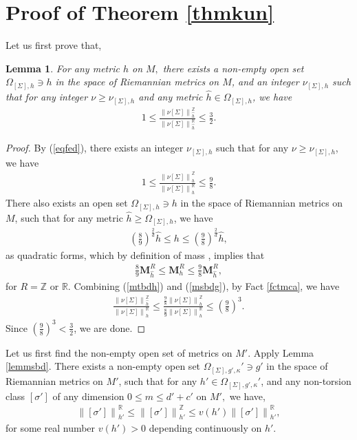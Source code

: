 \documentclass[11pt,a4paper]{amsart}
\numberwithin{equation}{section}
\newcommand{\Om}{\Omega}
\newcommand{\si}{\sigma}
\newcommand{\Si}{\Sigma}
\newcommand{\ms}{\mathbf{M}}
\newcommand{\no}[1]{\left\lVert#1\right\rVert}
\newcommand{\ka}{\kappa}
\newcommand{\R}{\mathbb{R}}
\newcommand{\Z}{\mathbb{Z}}
\theoremstyle{plain}
\newtheorem{lem}{Lemma}[subsection]
\theoremstyle{definition}
\numberwithin{equation}{subsection}
\begin{document}
		\section{Proof of Theorem \ref{thmkun}}\label{secpfp}	Let us first prove that,
	\begin{lem}\label{lemfaa}
		For any metric $h$ on $M,$ there exists a non-empty open set $\Om_{[\Si],h}\ni h$ in the space of Riemannian metrics on $M$, and an integer $\nu_{[\Si],h}$ such that for any integer $\nu\ge \nu_{[\Si],h}$ and any metric ${\hat{h}}\in \Om_{[\Si],h}$, we have
		\begin{align}
			1\le\frac{\no{\nu[\Si]}^{\Z}_{{\hat{h}}}}{\no{\nu[\Si]}^{\R}_{{\hat{h}}}}\le\frac{3}{2}.
		\end{align} 
	\end{lem}
	\begin{proof}
		By (\ref{eqfed}), there exists an integer $ \nu_{[\Si],h}$ such that for any $\nu\ge \nu_{[\Si],h}$, we have 
		\begin{align}\label{msbdg}
			1\le\frac{\no{\nu[\Si]}^{\Z}_h}{\no{\nu[\Si]}^{\R}_h}\le\frac{9}{8}.
		\end{align} There also exists an open set $\Om_{[\Si],h}\ni h$ in the space of Riemannian metrics on $M$, such that for any metric ${\hat{h}}\ge \Om_{[\Si],h}$, we  have \begin{align}
			\left(\frac{8}{9}\right)^{\frac{2}{d}}{\hat{h}}\le h\le\left(\frac{9}{8}\right)^{\frac{2}{d}}{\hat{h}},
		\end{align} as quadratic forms, which by definition of mass \cite[p.358]{HF}, implies that
		\begin{align}\label{mtbdh}
			\frac{8}{9}\ms_{{\hat{h}}}^{R}\le \ms_h^{R}\le	\frac{9}{8}\ms_{{\hat{h}}}^{R},
		\end{align}for $R=\Z$ or $\R$. 
		Combining (\ref{mtbdh}) and (\ref{msbdg}), by Fact \ref{fctmca}, we have
		\begin{align*}
			\frac{\no{\nu[\Si]}^{\Z}_{{\hat{h}}}}{\no{\nu[\Si]}^{\R}_{{\hat{h}}}}\le \frac{\frac{9}{8}\no{\nu[\Si]}^{\Z}_h}{\frac{8}{9}\no{\nu[\Si]}^{\R}_h}
			\le\left(\frac{9}{8}\right)^{3}.
		\end{align*} Since $\left(\frac{9}{8}\right)^3<\frac{3}{2}$, we are done.
	\end{proof}
	Let us first find the non-empty open set of metrics on $M'$.	Apply Lemma \ref{lemmsbd}. There exists a non-empty open set $\Om_{[\Si],g',\ka}'\ni g'$ in the space of Riemannian metrics on $M'$, such that for any $h'\in \Om_{[\Si],g',\ka}'$, and any non-torsion class $[\si']$ of any dimension $0\le m\le d'+c'$ on $M',$ we have,
	\begin{align*}
		\no{[\si']}_{h'}^{\R}\le \no{[\si']}_{h'}^{\Z}\le v({h'})	\no{[\si']}_{h'}^{\R},	
	\end{align*}for some real number $v({h'})>0$ depending continuously on $h'$.	
	
\end{document}
